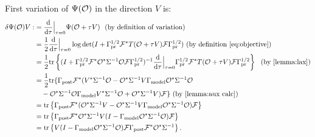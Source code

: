 \documentclass{amsart}
\numberwithin{equation}{section}
\begin{document}
First variation of $\Psi (\mathcal{O})$ in the direction $V$ is:
\begin{align*}%
  \begin{split}
    \delta \tar(\obs) V 
    :&= \frac{\der}{\der\tau} \Big |_{\tau=0} \tar(\obs + \tau V)\  \text{ (by definition of variation)}\\
    &= \frac12 \frac{\der}{\der \tau} \Big |_{\tau=0} \log \det 
    (I + \prcov^{1/2} \fwd^* T(\obs+\tau V)\fwd \prcov^{1/2} ) \text{ (by definition \eqref{eq:objective})}\\
    &= \frac12 \tr{( I + \prcov^{1/2} \fwd^* \obs^* \Sigma^{-1}
    \obs\fwd \prcov^{1/2} )^{-1}
    \frac{\der}{\der \tau} \Big |_{\tau=0}
    \prcov^{1/2} \fwd^* T(\obs+\tau V) \fwd \prcov^{1/2}}\ \text{ (by \ref{lemma:lax})}\\
    &= \frac12 \ttr{\postcov \fwd^* (V^* \Sigma^{-1} \obs 
      - \obs^*\Sigma^{-1} V\modcov \obs^* \Sigma^{-1}\obs \\
      &\ \ \ - \obs^* \Sigma^{-1} \obs \modcov V^* \Sigma^{-1}\obs 
      + \obs^* \Sigma^{-1} V ) \fwd}  \text{ (by \ref{lemma:aux calc})}\\
    &= \tr{\postcov \fwd^* ( \obs^* \Sigma^{-1} V 
    - \obs^*\Sigma^{-1} V\modcov \obs^* \Sigma^{-1}\obs ) \fwd} \\
    &= \tr{\postcov \fwd^* \obs^* \Sigma^{-1} V 
    ( I - \modcov \obs^* \Sigma^{-1}\obs ) \fwd} \\
    &= \tr{V ( I - \modcov \obs^* \Sigma^{-1}\obs )
    \fwd \postcov \fwd^* \obs^* \Sigma^{-1}}.
  \end{split}
\end{align*} 
\end{document}
